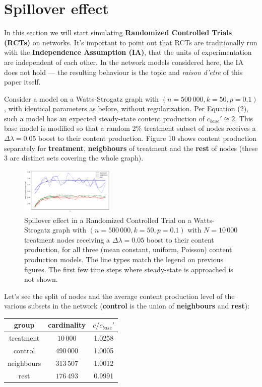 \documentclass[final,5p,times,twocolumn,authoryear]{elsarticle}
\begin{document}
\section{Spillover effect}

In this section we will start simulating \textbf{Randomized Controlled Trials (RCTs)} on networks. It's important to point out that RCTs are traditionally run with the \textbf{Independence Assumption (IA)}, that the units of experimentation are independent of each other. In the network models considered here, the IA does not hold --- the resulting behaviour is the topic and \textit{raison d'etre} of this paper itself.

Consider a model on a Watts-Strogatz graph with $(n=500\,000, k=50, p=0.1)$, with identical parameters as before, without regularization. Per Equation (2), such a model has an expected steady-state content production of $c_{base}\prime \approxeq 2$. This base model is modified so that a random 2\% treatment subset of nodes receives a $\Delta \lambda = 0.05$ boost to their content production. Figure 10 shows content production separately for \textbf{treatment}, \textbf{neigbhours} of treatment and the \textbf{rest} of nodes (these 3 are distinct sets covering the whole graph).

\begin{figure}[h]
	\centering 
	\includegraphics[width=0.4\textwidth]{figure-10.png}	
	\caption{Spillover effect in a Randomized Controlled Trial on a Watts-Strogatz graph with $(n=500\,000, k=50, p=0.1)$ with $N=10\,000$ treatment nodes receiving a $\Delta \lambda = 0.05$ boost to their content production, for all three (mean constant, uniform, Poisson) content production models. The line types match the legend on previous figures. The first few time steps where steady-state is approached is not shown.} 
\end{figure}

Let's see the split of nodes and the average content production level of the various subsets in the network (\textbf{control} is the union of \textbf{neighbours} and \textbf{rest}):

\begin{center}
\begin{tabular}{ |c|c|c| } 
 \hline
 \textbf{group} & \textbf{cardinality} & $c / c_{base}\prime$ \\ 
 \hline
 treatment   &   $10\,000$   &  1.0258 \\ 
 control     &  $490\,000$   &  1.0005 \\ 
 neighbours  &  $313\,507$   &  1.0012 \\ 
 rest        &  $176\,493$   &  0.9991 \\ 
 \hline
\end{tabular}
\end{center}
\end{document}
